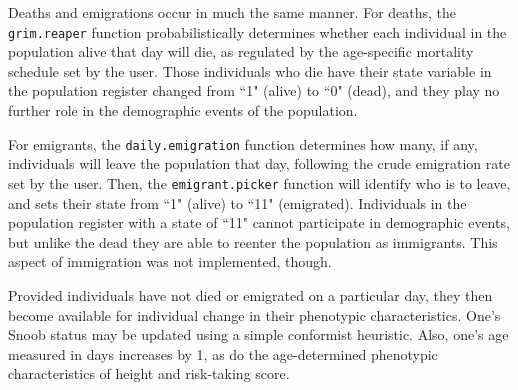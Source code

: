 Deaths and emigrations occur in much the same manner.  For deaths, the\\ \texttt{grim.reaper} function probabilistically determines whether each individual in the population alive that day will die, as regulated by the age-specific mortality schedule set by the user.  Those individuals who die have their state variable in the population register changed from ``1" (alive) to ``0" (dead), and they play no further role in the demographic events of the population.  

For emigrants, the \texttt{daily.emigration} function determines how many, if any, individuals will leave the population that day, following the crude emigration rate set by the user.  Then, the \texttt{emigrant.picker} function will identify who is to leave, and sets their state from ``1" (alive) to ``11" (emigrated).  Individuals in the population register with a state of ``11" cannot participate in demographic events, but unlike the dead they are able to reenter the population as immigrants.  This aspect of immigration was not implemented, though.  

Provided individuals have not died or emigrated on a particular day, they then become available for individual change in their phenotypic characteristics.  One's Snoob status may be updated using a simple conformist heuristic.  Also, one's age measured in days increases by 1, as do the age-determined phenotypic characteristics of height and risk-taking score.   







